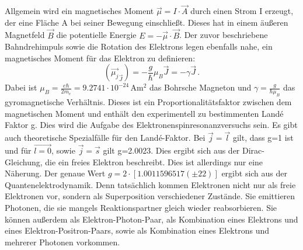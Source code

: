 \documentclass{scrartcl}
\begin{document}
Allgemein wird ein magnetisches Moment $\Vec{\mu}=I\cdot\Vec{A}$ durch einen Strom I erzeugt, der eine Fläche A bei seiner Bewegung einschließt. Dieses hat in einem äußeren Magnetfeld $\Vec{B}$ die potentielle Energie $E=-\Vec{\mu}\cdot\Vec{B}$. 
Der zuvor beschriebene Bahndrehimpuls sowie die Rotation des Elektrons legen ebenfalls nahe, ein magnetisches Moment für das Elektron zu definieren:
\begin{equation}
    (\Vec{\mu_{j}}_{\Vec{J}})=-\frac{g}{\hbar}\mu_{B}\Vec{J}=-\gamma \Vec{J} \,.
\end{equation}
Dabei ist $\mu_{B}=\frac{e\hbar}{2m_{e}}=9.2741\cdot10^{-24} \, \mathrm{Am^{2}}$ das Bohrsche Magneton und $\gamma=\frac{g}{\hbar\mu_{B}}$ das gyromagnetische Verhältnis. 
Dieses ist ein Proportionalitätsfaktor zwischen dem magnetischen Moment und enthält den experimentell zu bestimmenten Landé Faktor g. Dies wird die Aufgabe des Elektronenspinresonanzversuchs sein. Es gibt auch theoretische Spezialfälle für den Landé-Faktor. Bei $\Vec{j}=\Vec{l}$ gilt, dass g=1 ist und für $\Vec{l=0}$, sowie $\Vec{j}=\Vec{s}$ gilt g=2.0023. Dies ergibt sich aus der Dirac-Gleichung, die ein freies Elektron beschreibt. Dies ist allerdings nur eine Näherung. Der genaue Wert $g=2\cdot[1.0011596517(\pm22)]$ ergibt sich aus der Quantenelektrodynamik. Denn tatsächlich kommen Elektronen nicht nur als freie Elektronen vor, sondern als Superposition verschiedener Zustände. Sie emittieren Photonen, die sie mangels Reaktionspartner gleich wieder reabsorbieren. Sie können außerdem als Elektron-Photon-Paar, als Kombination eines Elektrons und eines Elektron-Positron-Paars, sowie als Kombination eines Elektrons und mehrerer Photonen vorkommen. 
\\
\end{document}
